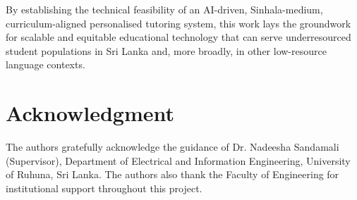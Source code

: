 \documentclass[conference]{IEEEtran}
\begin{document}
By establishing the technical feasibility of an AI-driven, Sinhala-medium, curriculum-aligned personalised tutoring system, this work lays the groundwork for scalable and equitable educational technology that can serve underresourced student populations in Sri Lanka and, more broadly, in other low-resource language contexts.

\section*{Acknowledgment}

The authors gratefully acknowledge the guidance of Dr. Nadeesha Sandamali (Supervisor), Department of Electrical and Information Engineering, University of Ruhuna, Sri Lanka. The authors also thank the Faculty of Engineering for institutional support throughout this project.
\end{document}
